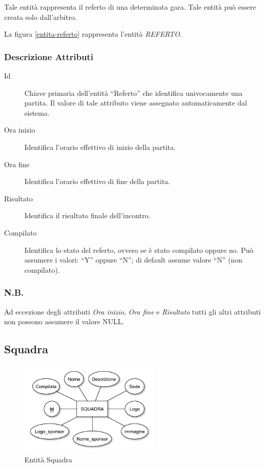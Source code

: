 		Tale entità rappresenta il referto di una determinata gara. Tale entità può essere creata solo dall'arbitro.
		
		La figura \ref{entita-referto} rappresenta l'entità \emph{REFERTO}.
		
		\subsubsection*{Descrizione Attributi}
		
		\begin{description}
			
			\item[Id]
			Chiave primaria dell'entità ``Referto'' che identifica univocamente una partita. Il valore di tale attributo viene assegnato automaticamente dal sistema.
			
			\item[Ora inizio]
			Identifica l'orario effettivo di inizio della partita.
			
			\item[Ora fine]
			Identifica l'orario effettivo di fine della partita.
			
			\item[Risultato]
			Identifica il risultato finale dell'incontro.
			
			\item[Compilato]
			Identifica lo stato del referto, ovvero se è stato compilato oppure no. Può assumere i valori: ``Y'' oppure ``N''; di default assume valore ``N'' (non compilato).
			
		\end{description}
		
		\subsubsection*{N.B.}
		Ad eccezione degli attributi \emph{Ora inizio}, \emph{Ora fine} e \emph{Risultato} tutti gli altri attributi non possono assumere il valore NULL.
	
	\subsection{Squadra}
	
		\begin{figure}[h]
			\centering
			\includegraphics[width=0.6\textwidth]
			{immagini/09-squadra}
			
			\caption{Entità Squadra}
			\label{entita-squadra}
		\end{figure}
		
